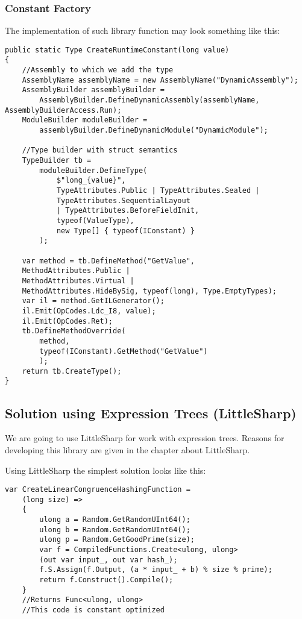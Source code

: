 \subsubsection{Constant Factory}
The implementation of such library function may look something like this:
\begin{lstlisting}
public static Type CreateRuntimeConstant(long value)
{
    //Assembly to which we add the type
    AssemblyName assemblyName = new AssemblyName("DynamicAssembly");
    AssemblyBuilder assemblyBuilder =
        AssemblyBuilder.DefineDynamicAssembly(assemblyName, AssemblyBuilderAccess.Run);
    ModuleBuilder moduleBuilder =
        assemblyBuilder.DefineDynamicModule("DynamicModule");

    //Type builder with struct semantics
    TypeBuilder tb = 
        moduleBuilder.DefineType(
            $"long_{value}",
            TypeAttributes.Public | TypeAttributes.Sealed | 
            TypeAttributes.SequentialLayout 
            | TypeAttributes.BeforeFieldInit,
            typeof(ValueType),
            new Type[] { typeof(IConstant) }
        );
    
    var method = tb.DefineMethod("GetValue", 
    MethodAttributes.Public | 
    MethodAttributes.Virtual | 
    MethodAttributes.HideBySig, typeof(long), Type.EmptyTypes);
    var il = method.GetILGenerator();
    il.Emit(OpCodes.Ldc_I8, value);
    il.Emit(OpCodes.Ret);
    tb.DefineMethodOverride(
        method,
        typeof(IConstant).GetMethod("GetValue")
        );
    return tb.CreateType();
} 
\end{lstlisting}



\subsection{Solution using Expression Trees (LittleSharp)}
We are going to use LittleSharp for work with expression trees. Reasons for developing this library are given in the chapter about LittleSharp.

Using LittleSharp the simplest solution looks like this:
\begin{lstlisting}
var CreateLinearCongruenceHashingFunction = 
    (long size) =>
    {
        ulong a = Random.GetRandomUInt64();
        ulong b = Random.GetRandomUInt64();
        ulong p = Random.GetGoodPrime(size);
        var f = CompiledFunctions.Create<ulong, ulong>
        (out var input_, out var hash_);
        f.S.Assign(f.Output, (a * input_ + b) % size % prime);
        return f.Construct().Compile();
    }
    //Returns Func<ulong, ulong>
    //This code is constant optimized
\end{lstlisting}

